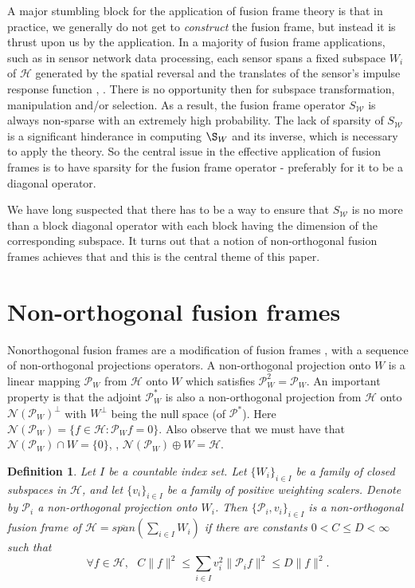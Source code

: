 \documentclass[11pt,reqno]{amsart}
\newtheorem{definition}[thm]{Definition}
\theoremstyle{remark}
\begin{document}
A major stumbling block
for the application of fusion frame theory is that in practice, we generally do not get to
{\it construct} the fusion frame, but instead it is thrust upon us by the application.
In a majority of fusion frame applications, such as in sensor network data processing, each sensor spans a fixed subspace $W_i$ of ${\mathcal H}$
generated by the spatial reversal and the translates of the sensor's impulse response function \cite{LiYan08}, \cite{LiYaoYi2008}. There is no opportunity then
for subspace transformation, manipulation and/or selection.  As a result, the fusion frame operator $S_{{\mathcal W}}$ is always non-sparse with an extremely high probability.  The lack of sparsity of ${S_{{\mathcal W}}}$ is
a significant hinderance in computing $\S_W$
and its inverse, which is necessary to apply the theory.
So the central issue in the effective application of fusion frames is to have sparsity
for the fusion frame operator - preferably for it to be a diagonal operator.

We have long suspected that there has to be a way to ensure that ${S_{{\mathcal W}}}$ is no more than a block diagonal operator with each block having the dimension of the corresponding subspace.   It turns out that a notion of non-orthogonal fusion frames achieves that and this is the central theme of
this paper.

\section{Non-orthogonal fusion frames}

Nonorthogonal fusion frames are a modification of fusion frames \cite{CK04}, \cite{CKL08} with a sequence of non-orthogonal projections operators.  A non-orthogonal projection onto $W$ is a linear mapping
$\mathcal{P}_{W}$ from $\mathcal{H}$ onto $W$ which satisfies $\mathcal{P}_{W}^2=\mathcal{P}_{W}$.
An important property is that the adjoint $\mathcal{P}^{*}_{W}$ is also a non-orthogonal
projection from $\mathcal{H}$ onto $\mathcal{N}(\mathcal{P}_{W})^{\perp}$ with $W^{\perp}$
being the null space (of ${{\mathcal P}}^*$).  Here
$\mathcal{N}(\mathcal{P}_{W})=\{f\in\mathcal{H}:\mathcal{P}_{W}f=0\}$.  Also observe that
we must have that $\mathcal{N}(\mathcal{P}_{W})\cap W=\{0\}$, ,
$\mathcal{N}(\mathcal{P}_{W})\oplus W=\mathcal{H}$.

\begin{definition}
Let $I$ be a countable index set.  Let $\{W_i\}_{i\in I}$ be a family of closed subspaces in ${\mathcal H}$, and let $\{v_i\}_{i\in I}$ be a family of positive weighting scalers.  Denote by ${{\mathcal P}}_i$ a non-orthogonal projection onto $W_i$.  Then $\{{{\mathcal P}}_i, v_i\}_{i\in I}$ is a {\it non-orthogonal fusion frame} of ${\mathcal H}=\overline{span}(\sum_{i\in I} W_i)$ if there are constants $0 < C\leq D < \infty$ such that
\begin{equation}\label{nonog-FF}
\forall f\in{\mathcal H}, \ \ \ C\|f\|^2\leq \sum_{i\in I} v_i^2\|{{\mathcal P}}_i f\|^2 \leq D\|f\|^2.
\end{equation}
\end{definition}
\end{document}
